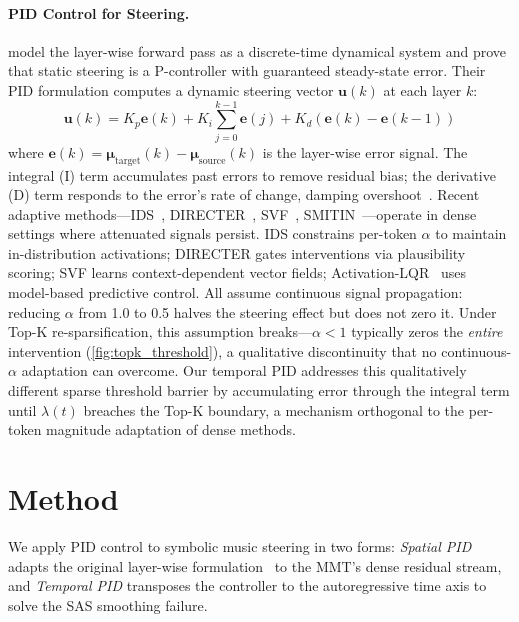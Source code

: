 \documentclass{article}
\theoremstyle{plain}
\begin{document}
\paragraph{PID Control for Steering.}
\citet{nguyen2026pid} model the layer-wise forward pass as a discrete-time dynamical system and prove that static steering is a P-controller with guaranteed steady-state error. Their PID formulation computes a dynamic steering vector $\mathbf{u}(k)$ at each layer $k$:
\begin{equation}
    \mathbf{u}(k) = K_p \mathbf{e}(k) + K_i \textstyle\sum_{j=0}^{k-1}\mathbf{e}(j) + K_d (\mathbf{e}(k) - \mathbf{e}(k{-}1))
    \label{eq:pid_spatial}
\end{equation}
where $\mathbf{e}(k) = \boldsymbol{\mu}_\text{target}(k) - \boldsymbol{\mu}_\text{source}(k)$ is the layer-wise error signal. The integral (I) term accumulates past errors to remove residual bias; the derivative (D) term responds to the error's rate of change, damping overshoot~\cite{astrom1995pid}. Recent adaptive methods---IDS~\cite{vogels2025ids}, DIRECTER~\cite{kang2026directer}, SVF~\cite{li2026svf}, SMITIN~\cite{luo2025smitin}---operate in dense settings where attenuated signals persist. IDS constrains per-token $\alpha$ to maintain in-distribution activations; DIRECTER gates interventions via plausibility scoring; SVF learns context-dependent vector fields; Activation-LQR~\cite{nguyen2026pid} uses model-based predictive control. All assume continuous signal propagation: reducing $\alpha$ from 1.0 to 0.5 halves the steering effect but does not zero it. Under Top-K re-sparsification, this assumption breaks---$\alpha < 1$ typically zeros the \emph{entire} intervention (\cref{fig:topk_threshold}), a qualitative discontinuity that no continuous-$\alpha$ adaptation can overcome. Our temporal PID addresses this qualitatively different sparse threshold barrier by accumulating error through the integral term until $\lambda(t)$ breaches the Top-K boundary, a mechanism orthogonal to the per-token magnitude adaptation of dense methods.

\section{Method}
\label{sec:method}

We apply PID control to symbolic music steering in two forms: \emph{Spatial PID} adapts the original layer-wise formulation~\cite{nguyen2026pid} to the MMT's dense residual stream, and \emph{Temporal PID} transposes the controller to the autoregressive time axis to solve the SAS smoothing failure.
\end{document}
